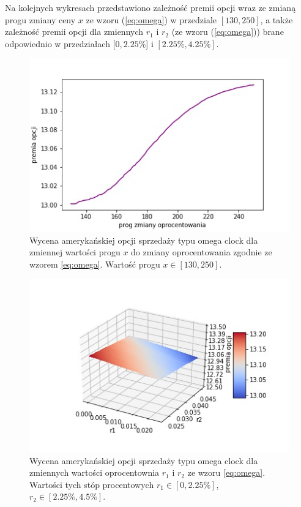 \documentclass[]{pwr_wmat_praca_dyplomowa}
\theoremstyle{plain}
\numberwithin{theorem}{chapter}
\theoremstyle{definition}
\numberwithin{theorem}{chapter}
\begin{document}
Na kolejnych wykresach przedstawiono zależność premii opcji wraz ze zmianą progu zmiany ceny $x$ ze wzoru (\ref{eq:omega}) w przedziale $[130,250]$, a także zależność premii opcji dla zmiennych $r_1$ i $r_2$ (ze wzoru (\ref{eq:omega})) brane odpowiednio w przedziałach $[0,2.25\%$] i $[2.25\%,4.25\%]$.

\begin{figure}[h!]
\centering
\includegraphics[scale=0.9]{apple_zmienny_prog_2.jpg}
\caption{Wycena amerykańskiej opcji sprzedaży typu omega clock dla zmiennej wartości progu $x$ do zmiany oprocentowania zgodnie ze wzorem \ref{eq:omega}. Wartość progu $x \in [130,250]$.}
\label{fig:apple_prog}
\end{figure}

\begin{figure}[h!]
\centering
\includegraphics[scale=1.1]{apple_zmienne_r1_i_r2.jpg}
\caption{Wycena amerykańskiej opcji sprzedaży typu omega clock dla zmiennych wartości oprocentownia $r_1$ i $r_2$ ze wzoru \ref{eq:omega}. Wartości tych stóp procentowych $r_1 \in [0,2.25\%]$, $r_2 \in [2.25\%,4.5\%]$.}
\label{fig:apple_zal_r1_r2}
\end{figure}
\end{document}
